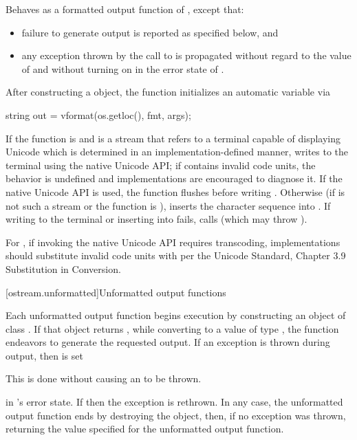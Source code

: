 \begin{itemdescr}
\pnum
\effects
Behaves as a formatted output function
of , except that:
\begin{itemize}
\item
failure to generate output is reported as specified below, and
\item
any exception thrown by the call to  is propagated
without regard to the value of  and
without turning on  in the error state of .
\end{itemize}
After constructing a  object,
the function initializes an automatic variable via
\begin{codeblock}
string out = vformat(os.getloc(), fmt, args);
\end{codeblock}
If the function is  and
 is a stream that refers to a terminal capable of displaying Unicode
which is determined in an implementation-defined manner,
writes  to the terminal using the native Unicode API;
if  contains invalid code units,
%
the behavior is undefined and
implementations are encouraged to diagnose it.
If the native Unicode API is used,
the function flushes  before writing .
Otherwise (if  is not such a stream or
the function is ),
inserts the character sequence
 into .
If writing to the terminal or inserting into  fails,
calls 
(which may throw ).

\pnum
\recommended
For ,
if invoking the native Unicode API requires transcoding,
implementations should substitute invalid code units
with  per
the Unicode Standard, Chapter 3.9  Substitution in Conversion.
\end{itemdescr}

[ostream.unformatted]{Unformatted output functions}

\pnum
Each
unformatted
output function begins execution by constructing an object of class
.
If that object returns
,
while converting to a value of type
,
the function endeavors
to generate the requested output.
If an exception is thrown during output, then
is set
\begin{footnote}
This is done without causing an
to be thrown.
\end{footnote}
in
's
error state.
If
then the exception is rethrown.
In any case, the unformatted output function ends by destroying the
 object, then, if no exception was thrown, returning the value
specified for the unformatted output function.

